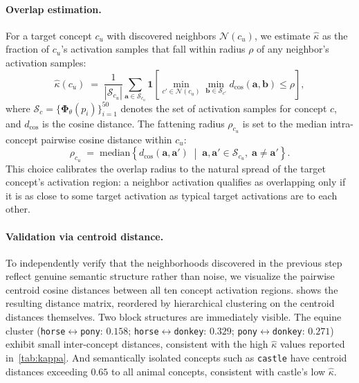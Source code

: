\paragraph{Overlap estimation.}
For a target concept $c_u$ with discovered neighbors $\mathcal{N}(c_u)$, we estimate $\hat\kappa$ as the fraction of $c_u$'s activation samples that fall within radius $\rho$ of any neighbor's activation samples:
\begin{equation}
    \hat\kappa(c_u) \;=\; \frac{1}{|\mathcal{S}_{c_u}|} \sum_{\mathbf{a} \in \mathcal{S}_{c_u}} \mathbf{1}\!\left[\min_{c' \in \mathcal{N}(c_u)} \min_{\mathbf{b} \in \mathcal{S}_{c'}} d_{\cos}(\mathbf{a}, \mathbf{b}) \leq \rho\right],
\end{equation}
where $\mathcal{S}_c = \{\boldsymbol{\Phi}_\theta(p_i)\}_{i=1}^{50}$ denotes the set of activation samples for concept $c$, and $d_{\cos}$ is the cosine distance. 
The fattening radius $\rho_{c_u}$ is set to the median intra-concept pairwise cosine distance within $c_u$:
\begin{equation}
    \rho_{c_u} \;=\; \mathrm{median}\!\left\{d_{\cos}(\mathbf{a}, \mathbf{a}') \;\middle|\; \mathbf{a}, \mathbf{a}' \in \mathcal{S}_{c_u},\; \mathbf{a} \neq \mathbf{a}'\right\}.
\end{equation}
This choice calibrates the overlap radius to the natural spread of the target concept's activation region: a neighbor activation qualifies as overlapping only if it is as close to some target activation as typical target activations are to each other.

\paragraph{Validation via centroid distance.}
To independently verify that the neighborhoods discovered in the previous step reflect genuine semantic structure rather than noise, we visualize the pairwise centroid cosine distances between all ten concept activation regions.  shows the resulting distance matrix, reordered by hierarchical clustering on the centroid distances themselves. Two block structures are immediately visible. The equine cluster (\texttt{horse}$\leftrightarrow$\texttt{pony}: $0.158$; \texttt{horse}$\leftrightarrow$\texttt{donkey}: $0.329$; \texttt{pony}$\leftrightarrow$\texttt{donkey}: $0.271$) 
exhibit small inter-concept distances, 
consistent with the high $\hat\kappa$ values reported in~\cref{tab:kappa}. 
And semantically isolated concepts such as \texttt{castle} have centroid distances exceeding $0.65$ to all animal concepts, consistent with castle's low $\hat\kappa$.

